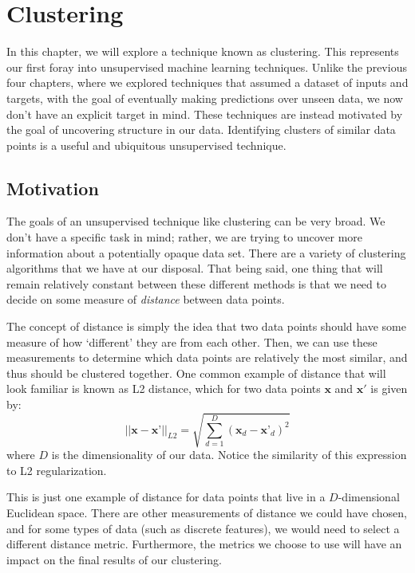 \chapter{Clustering}
In this chapter, we will explore a technique known as clustering. This represents our first foray into unsupervised machine learning techniques. Unlike the previous four chapters, where we explored techniques that assumed a dataset of inputs and targets, with the goal of eventually making predictions over unseen data, we now don't have an explicit target in mind. These techniques are instead motivated by the goal of uncovering structure in our data. Identifying clusters of similar data points is a useful and ubiquitous unsupervised technique.

\section{Motivation}
The goals of an unsupervised technique like clustering can be very broad. We don't have a specific task in mind; rather, we are trying to uncover more information about a potentially opaque data set. There are a variety of clustering algorithms that we have at our disposal. That being said, one thing that will remain relatively constant between these different methods is that we need to decide on some measure of \textit{distance} between data points.

The concept of distance is simply the idea that two data points should have some measure of how `different' they are from each other. Then, we can use these measurements to determine which data points are relatively the most similar, and thus should be clustered together. One common example of distance that will look familiar is known as L2 distance, which for two data points $\textbf{x}$ and $\textbf{x}'$ is given by:
\begin{equation} \label{l2-distance}
	|| \textbf{x} - \textbf{x'} ||_{L2} = \sqrt{\sum_{d=1}^{D} (\textbf{x}_{d} - \textbf{x'}_{d})^{2}}
\end{equation}
where $D$ is the dimensionality of our data. Notice the similarity of this expression to L2 regularization.

This is just one example of distance for data points that live in a $D$-dimensional Euclidean space. There are other measurements of distance we could have chosen, and for some types of data (such as discrete features), we would need to select a different distance metric. Furthermore, the metrics we choose to use will have an impact on the final results of our clustering.

